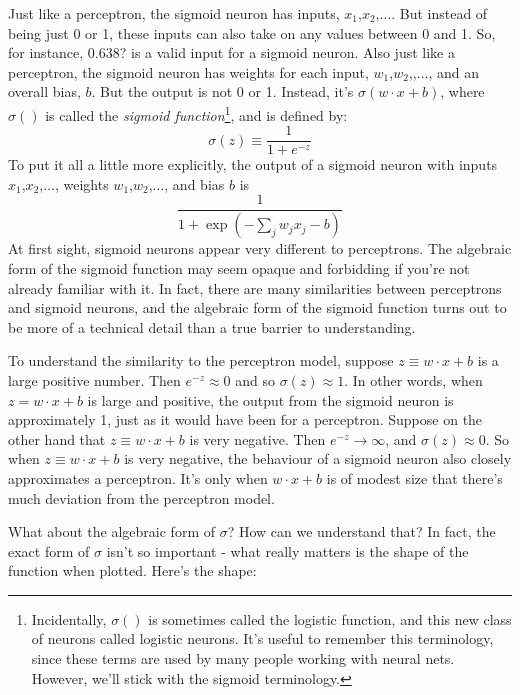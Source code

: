 Just like a perceptron, the sigmoid neuron has inputs, $x_1$,$x_2$,$\ldots$. But instead of being just 0 or 1, these inputs can also take on any values between 0 and 1. So, for instance, 0.638? is a valid input for a sigmoid neuron. Also just like a perceptron, the sigmoid neuron has weights for each input, $w_1$,$w_2$,,$\ldots$, and an overall bias, $b$. But the output is not 0 or 1. Instead, it's $\sigma(w \cdot x+b)$, where $\sigma()$ is called the \textit{sigmoid function}\footnote{Incidentally, $\sigma()$ is sometimes called the logistic function, and this new class of neurons called logistic neurons. It's useful to remember this terminology, since these terms are used by many people working with neural nets. However, we'll stick with the sigmoid terminology.}, and is defined by: 
\begin{equation}
\sigma(z) \equiv \frac{1}{1+e^{-z}}
\label{eq:c01-03-sigmoidfunction}
\end{equation}
To put it all a little more explicitly, the output of a sigmoid neuron with inputs $x_1$,$x_2$,$\ldots$, weights $w_1$,$w_2$,$\ldots$, and bias $b$ is 
\begin{equation}
\frac{1}{1+\exp \left(-\sum_{j} w_{j} x_{j}-b\right)}
\label{eq:ch01-04-sigmoidoutput}
\end{equation}
At first sight, sigmoid neurons appear very different to perceptrons. The algebraic form of the sigmoid function may seem opaque and forbidding if you're not already familiar with it. In fact, there are many similarities between perceptrons and sigmoid neurons, and the algebraic form of the sigmoid function turns out to be more of a technical detail than a true barrier to understanding.

To understand the similarity to the perceptron model, suppose $z \equiv w \cdot x+b$ is a large positive number. Then $e^{-z} \approx 0$ and so $\sigma(z) \approx 1$. In other words, when $z=w \cdot x+b$ is large and positive, the output from the sigmoid neuron is approximately 1, just as it would have been for a perceptron. Suppose on the other hand that $z \equiv w \cdot x+b$ is very negative. Then $e^{-z} \rightarrow \infty$, and $\sigma(z) \approx 0$. So when $z \equiv w \cdot x+b$ is very negative, the behaviour of a sigmoid neuron also closely approximates a perceptron. It's only when $w \cdot x+b$ is of modest size that there's much deviation from the perceptron model.

What about the algebraic form of $\sigma$? How can we understand that? In fact, the exact form of $\sigma$ isn't so important - what really matters is the shape of the function when plotted. Here's the shape:


